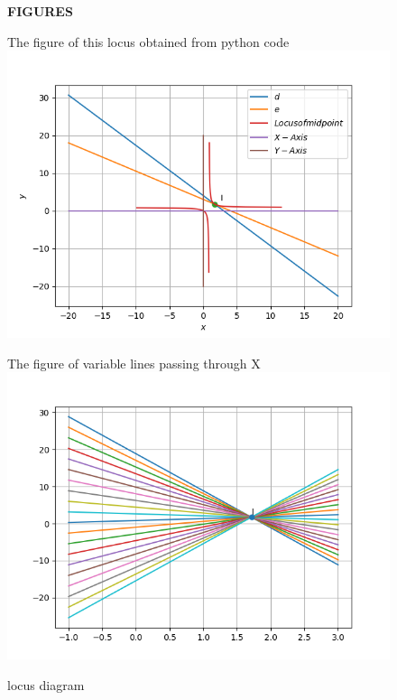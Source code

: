\documentclass[12pt]{article}
\begin{document}
\begin{center}
\begin{figure}[h]
\begin{center}
\textbf{FIGURES}\\
\end{center}
{The figure of this locus obtained from python code}
\includegraphics[scale=0.75]{locus}
\caption{locus diagram}
The figure of variable lines passing through X
\includegraphics[scale=0.75]{variable_lines}
\end{figure}
\end{center}
\end{document}
